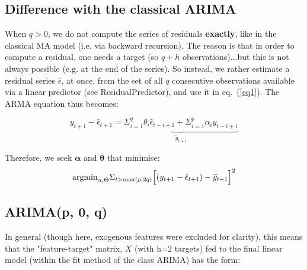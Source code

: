 \documentclass{article}
\begin{document}
\subsection{Difference with the classical ARIMA}
When $q>0$, we do not compute the series of residuals \textbf{exactly}, like in the classical MA model (i.e. via backward recursion). The reason is that in order to compute a residual, one needs a target (so $q+h$ observations)...but this is not always possible (e.g. at the end of the series). So instead, we rather estimate a residual series $\hat{\epsilon}$, at once, from the set of all $q$ consecutive observations available via a linear predictor (see {\selectfont ResidualPredictor}), and use it in eq.~(\ref{eq1}). The ARMA equation thus becomes: 

$$ y_{t+1} - \hat{\epsilon}_{t+1} = \underbrace{\Sigma_{i=1}^{q}\theta_{i} \hat{\epsilon}_{t-i+1} + \Sigma_{i=1}^{p}\alpha_{i} y_{t-i+1}}_{\widetilde{y}_{t+1}}$$




Therefore, we seek $\mathbf{\alpha}$ and $\mathbf{\theta}$ that minimise:
$$\textmd{argmin}_{\mathbf{\alpha}, \Theta} \Sigma_{t>\text{max}(p,2q)} \Big[ (y_{t+1}-\hat{\epsilon}_{t+1}) - \widetilde{y}_{t+1}\Big]^2$$


\subsection{ARIMA(p, 0, q)}

In general (though here, exogenous features were excluded for clarity), this means that the "feature-target" matrix, $X$ (with h=2 targets) fed to the final linear model (within the {\selectfont fit} method of the class {\selectfont ARIMA}) has the form:
\end{document}
